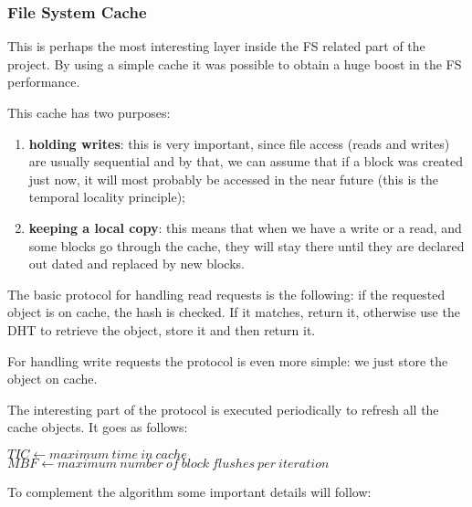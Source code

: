 \documentclass[times,9pt,article]{llncs}
\begin{document}
\subsubsection{File System Cache}

This is perhaps the most interesting layer inside the FS related part of the project. By using a simple cache it was possible to obtain a huge boost in the FS performance.

This cache has two purposes: 
\begin{enumerate}
\item \textbf{holding writes}: this is very important, since file access (reads and writes) are usually sequential and by that, we can assume that if a block was created just now, it will most probably be accessed in the near future (this is the temporal locality principle);
\item \textbf{keeping a local copy}: this means that when we have a write or a read, and some blocks go through the cache, they will stay there until they are declared out dated and replaced by new blocks.
\end{enumerate}


The basic protocol for handling read requests is the following: if the requested object is on cache, the hash is checked. If it matches, return it, otherwise use the DHT to retrieve the object, store it and then return it.

For handling write requests the protocol is even more simple: we just store the object on cache.

The interesting part of the protocol is executed periodically to refresh all the cache objects. It goes as follows:

\begin{algorithm}[H]
 $TIC \longleftarrow maximum\ time\ in\ cache$\;
 $MBF \longleftarrow maximum\ number\ of\ block\ flushes\ per\ iteration$\;
\end{algorithm}

To complement the algorithm some important details will follow:
\end{document}
